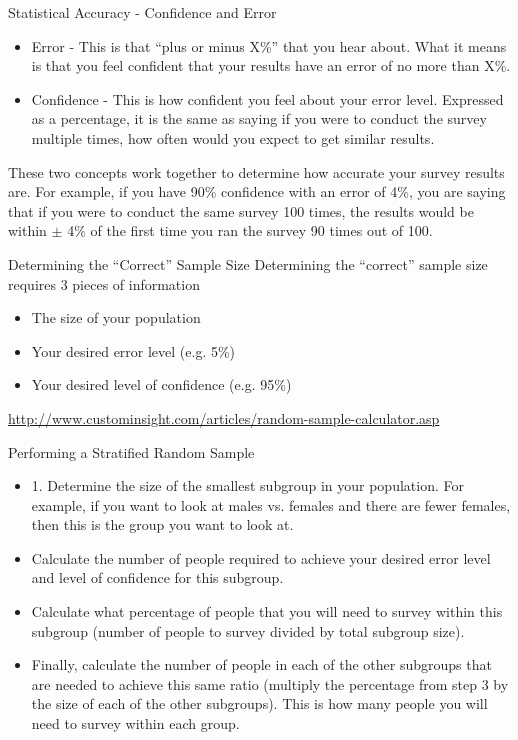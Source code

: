 \documentclass[10pt, compress]{beamer}
\begin{document}
\begin{frame}[t]{Statistical Accuracy - Confidence and Error}
    \begin{itemize}
        \item Error - This is that ``plus or minus X\%'' that you hear about. What it means is that you feel confident that your results have an error of no more than X\%.
        \item Confidence - This is how confident you feel about your error level. Expressed as a percentage, it is the same as saying if you were to conduct the survey multiple times, how often would you expect to get similar results.
    \end{itemize}
    \smallskip
    These two concepts work together to determine how accurate your survey results are. For example, if you have 90\% confidence with an error of 4\%, you are saying that if you were to conduct the same survey 100 times, the results would be within $\pm$ 4\% of the first time you ran the survey 90 times out of 100.
\end{frame}

\begin{frame}[t]{Determining the ``Correct'' Sample Size}
    Determining the ``correct'' sample size requires 3 pieces of information
    \begin{itemize}
        \item The size of your population
        \item Your desired error level (e.g. 5\%)
        \item Your desired level of confidence (e.g. 95\%)
    \end{itemize}
    \url{http://www.custominsight.com/articles/random-sample-calculator.asp}
\end{frame}

\begin{frame}[t]{Performing a Stratified Random Sample}
    \begin{itemize}
        \item 1.	Determine the size of the smallest subgroup in your population. For example, if you want to look at males vs. females and there are fewer females, then this is the group you want to look at.
        \item Calculate the number of people required to achieve your desired error level and level of confidence for this subgroup.
        \item Calculate what percentage of people that you will need to survey within this subgroup (number of people to survey divided by total subgroup size).
        \item Finally, calculate the number of people in each of the other subgroups that are needed to achieve this same ratio (multiply the percentage from step 3 by the size of each of the other subgroups). This is how many people you will need to survey within each group.
    \end{itemize}
\end{frame}
\end{document}
